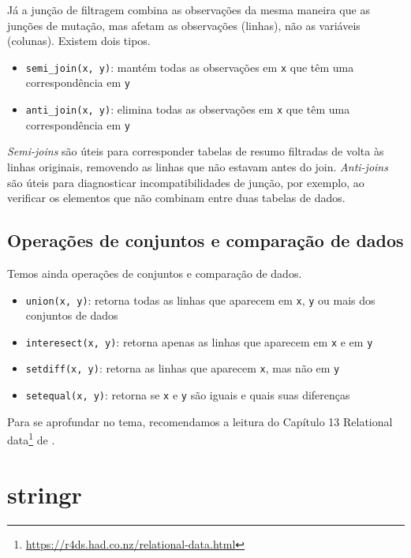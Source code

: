 \documentclass[
]{book}
\providecommand{\tightlist}{%
  \setlength{\itemsep}{0pt}\setlength{\parskip}{0pt}}
\renewcommand{\href}[2]{#2\footnote{\url{#1}}}
\begin{document}
Já a junção de filtragem combina as observações da mesma maneira que as junções de mutação, mas afetam as observações (linhas), não as variáveis (colunas). Existem dois tipos.

\begin{itemize}
\tightlist
\item
  \texttt{semi\_join(x,\ y)}: mantém todas as observações em \texttt{x} que têm uma correspondência em \texttt{y}
\item
  \texttt{anti\_join(x,\ y)}: elimina todas as observações em \texttt{x} que têm uma correspondência em \texttt{y}
\end{itemize}

\emph{Semi-joins} são úteis para corresponder tabelas de resumo filtradas de volta às linhas originais, removendo as linhas que não estavam antes do join. \emph{Anti-joins} são úteis para diagnosticar incompatibilidades de junção, por exemplo, ao verificar os elementos que não combinam entre duas tabelas de dados.

\hypertarget{operauxe7uxf5es-de-conjuntos-e-comparauxe7uxe3o-de-dados}{%
\subsection{Operações de conjuntos e comparação de dados}\label{operauxe7uxf5es-de-conjuntos-e-comparauxe7uxe3o-de-dados}}

Temos ainda operações de conjuntos e comparação de dados.

\begin{itemize}
\tightlist
\item
  \texttt{union(x,\ y)}: retorna todas as linhas que aparecem em \texttt{x}, \texttt{y} ou mais dos conjuntos de dados
\item
  \texttt{interesect(x,\ y)}: retorna apenas as linhas que aparecem em \texttt{x} e em \texttt{y}
\item
  \texttt{setdiff(x,\ y)}: retorna as linhas que aparecem \texttt{x}, mas não em \texttt{y}
\item
  \texttt{setequal(x,\ y)}: retorna se \texttt{x} e \texttt{y} são iguais e quais suas diferenças
\end{itemize}

Para se aprofundar no tema, recomendamos a leitura do Capítulo \href{https://r4ds.had.co.nz/relational-data.html}{13 Relational data} de \citet{wickham2017}.

\hypertarget{stringr}{%
\section{stringr}\label{stringr}}
\end{document}
